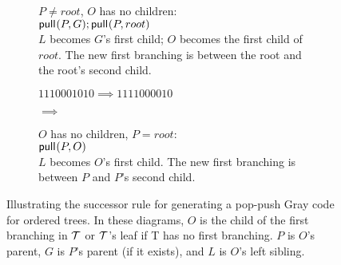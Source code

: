 \begin{figure}
\begin{subfigure}[]{.5 \textwidth}
\begin{center}
	\end{center}
	\caption{ $P \ne root$, $O$ has no children: \\
	$\mathsf{pull}_{}(P,G);\mathsf{pull}_{}(P,root)$ \\
	$L$ becomes $G$'s first child; $O$ becomes the first child of $root$.  The new first branching is between the root and the root's second child.\\
	}
	\label{fig:}
    \end{subfigure}
    \begin{subfigure}[]{.5 \textwidth}
	\begin{center}
	    $1110001010 \implies 1111000010$

$\implies$

	\end{center}
	\caption{$O$ has no children, $P = root$: \\
	$\mathsf{pull}_{}(P,O)$ \\
	    $L$ becomes $O$'s first child. The new first branching is between $P$ and $P$'s second child.
	}
	\label{fig:}
    \end{subfigure}

    \caption{Illustrating the successor rule for generating a pop-push Gray code for ordered trees.  In these diagrams, $O$ is the child of the first branching in $\mathcal{T}$ or $\mathcal{T}$'s leaf if T has no first branching.  
    $P$ is $O$'s parent, $G$ is $P$'s parent (if it exists), and $L$ is $O$'s left sibling.
    }
    \label{fig:otreeruledemo}

\end{figure}

